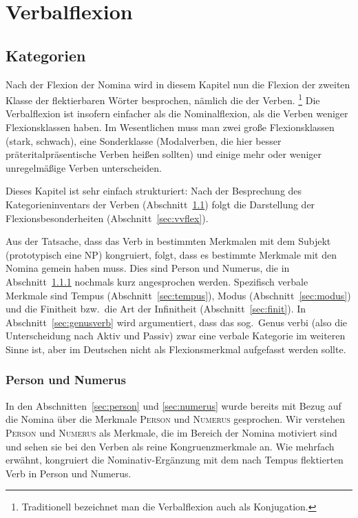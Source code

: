 \chapter{Verbalflexion}

\label{sec:verben}

\section{Kategorien}

\label{sec:vkat}

Nach der Flexion der Nomina wird in diesem Kapitel nun die Flexion der zweiten Klasse der flektierbaren Wörter besprochen, nämlich die der Verben.%
\footnote{Traditionell bezeichnet man die Verbalflexion auch als Konjugation.}
Die Verbalflexion ist insofern einfacher als die Nominalflexion, als die Verben weniger Flexionsklassen haben.
Im Wesentlichen muss man zwei große Flexionsklassen (stark, schwach), eine Sonderklasse (Modalverben, die hier besser präteritalpräsentische Verben heißen sollten) und einige mehr oder weniger unregelmäßige Verben unterscheiden.

Dieses Kapitel ist sehr einfach strukturiert:
Nach der Besprechung des Kategorieninventars der Verben (Abschnitt~\ref{sec:vkat}) folgt die Darstellung der Flexionsbesonderheiten (Abschnitt~\ref{sec:vvflex}).

Aus der Tatsache, dass das Verb in bestimmten Merkmalen mit dem Subjekt (prototypisch eine NP) kongruiert, folgt, dass es bestimmte Merkmale mit den Nomina gemein haben muss.
Dies sind Person und Numerus, die in Abschnitt~\ref{sec:vpersnum} nochmals kurz angesprochen werden.
Spezifisch verbale Merkmale sind Tempus (Abschnitt~\ref{sec:tempus}), Modus (Abschnitt~\ref{sec:modus}) und die Finitheit bzw.\ die Art der Infinitheit (Abschnitt~\ref{sec:finit}).
In Abschnitt~\ref{sec:genusverb} wird argumentiert, dass das sog.\ Genus verbi (also die Unterscheidung nach Aktiv und Passiv) zwar eine verbale Kategorie im weiteren Sinne ist, aber im Deutschen nicht als Flexionsmerkmal aufgefasst werden sollte.

\subsection{Person und Numerus}

\label{sec:vpersnum}


In den Abschnitten~\ref{sec:person} und \ref{sec:numerus} wurde bereits mit Bezug auf die Nomina über die Merkmale \textsc{Person} und \textsc{Numerus} gesprochen.
Wir verstehen \textsc{Person} und \textsc{Numerus} als Merkmale, die im Bereich der Nomina motiviert sind und sehen sie bei den Verben als reine Kongruenzmerkmale an.
Wie mehrfach erwähnt, kongruiert die Nominativ-Ergänzung mit dem nach Tempus flektierten Verb in Person und Numerus.

